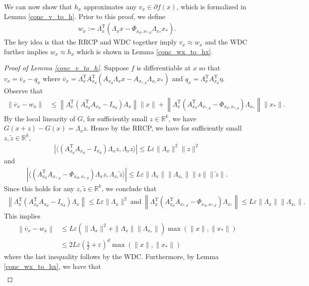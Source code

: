 \documentclass[11pt]{article}
\renewcommand{\epsilon}{\varepsilon}
\newcommand{\R}{\mathbb{R}}
\newcommand{\G}{G}
\renewcommand{\top}{{\mathrm{T}}}
\theoremstyle{remark}
\begin{document}
We can now show that $h_x$ approximates any $v_x \in \partial f(x)$, which is formalized in Lemma \ref{conc_v_to_h}. Prior to this proof, we define \begin{align}
    w_x := \Lambda_x^{\top}(\Lambda_x x - \Phi_{x_d,x_{*,d}}\Lambda_{x_*}x_*). \label{wx_def}
\end{align} The key idea is that the RRCP and WDC together imply $v_x \approx w_x$ and the WDC further implies $w_x \approx h_x$ which is shown in Lemma \ref{conc_wx_to_hx}.

\begin{proof}[Proof of Lemma \ref{conc_v_to_h}] Suppose $f$ is differentiable at $x$ so that $v_x = \overline{v}_x - q_x$ where
    $\overline{v}_x = \Lambda_x^\top A_{x_d}^\top (A_{x_d}\Lambda_x x - A_{x_{*,d}}\Lambda_{x_*}x_*)$ and $q_x = \Lambda_x^\top A_{x_d}^\top \eta$.  Observe that \begin{align*}
\left\|\overline{v}_x - w_x\right\| & \leqslant \left\|\Lambda_x^\top(A_{x_d}^\top A_{x_d} - I_{n_d})\Lambda_x\right\| \|x\| + \left\|\Lambda_x^\top(A_{x_d}^\top A_{x_{*,d}} - \Phi_{x_d, x_{*,d}})\Lambda_{x_*}\right\|\|x_*\|.
\end{align*} By the local linearity of $\G$, for sufficiently small $z \in \R^k$, we have $\G(x+z)-\G(x) = \Lambda_x z$. Hence by the RRCP, we have for sufficiently small $z,\tilde{z} \in \R^k$, \begin{align*}
    |\langle (A_{x_d}^{\top}A_{x_d}-I_{n_d})\Lambda_x z,\Lambda_xz\rangle| \leqslant L\epsilon \|\Lambda_x\|^2\|z\|^2
\end{align*} and \begin{align*}
    |\langle (A_{x_d}^{\top}A_{x_{*,d}}-\Phi_{x_d,x_{*,d}})\Lambda_x z,\Lambda_{x_*}\tilde{z}\rangle| \leqslant L\epsilon \|\Lambda_x\|\|\Lambda_{x_*}\|\|z\|\|\tilde{z}\|.
\end{align*} Since this holds for any $z,\tilde{z} \in \R^k$, we conclude that \begin{align*}
    \left\|\Lambda_x^\top(A_{x_d}^\top A_{x_d} - I_{n_d})\Lambda_x\right\| \leqslant L\epsilon\|\Lambda_x\|^2\ \text{and}\ \left\|\Lambda_x^\top(A_{x_d}^\top A_{x_{*,d}} - \Phi_{x_d, x_{*,d}})\Lambda_{x_*}\right\|\leqslant L\epsilon\|\Lambda_x\|\|\Lambda_{x_*}\|.
\end{align*} This implies \begin{align*}
\left\|\overline{v}_x - w_x\right\| & \leqslant L\epsilon\left(\|\Lambda_x\|^2 + \|\Lambda_x\|\|\Lambda_{x_*}\|\right) \max(\|x\|,\|x_*\|) \\
& \leqslant 2L \epsilon\left(\frac{1}{2} + \epsilon\right)^d \max(\|x\|,\|x_*\|) \end{align*} where the last inequality follows by the WDC. Furthermore, by Lemma \ref{conc_wx_to_hx}, we have that \begin{align*}

\end{align*}
\end{proof}
\end{document}
